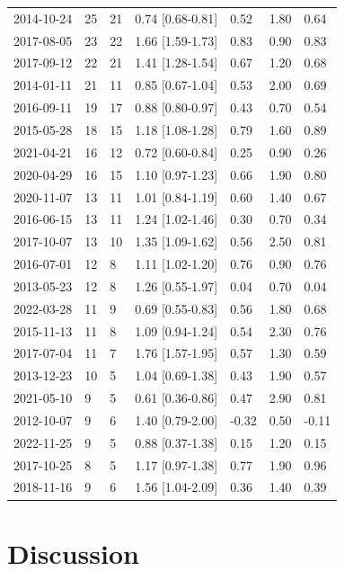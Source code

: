 \documentclass[preprint,12pt,authoryear]{elsarticle}
\begin{document}
\begin{table}[]
\begin{tabular}{lllll|ll}
2014-10-24 & 25 & 21 & 0.74 [0.68-0.81] & 0.52 & 1.80 & 0.64 \\
2017-08-05 & 23 & 22 & 1.66 [1.59-1.73] & 0.83 & 0.90 & 0.83 \\
2017-09-12 & 22 & 21 & 1.41 [1.28-1.54] & 0.67 & 1.20 & 0.68 \\
2014-01-11 & 21 & 11 & 0.85 [0.67-1.04] & 0.53 & 2.00 & 0.69 \\
2016-09-11 & 19 & 17 & 0.88 [0.80-0.97] & 0.43 & 0.70 & 0.54 \\
2015-05-28 & 18 & 15 & 1.18 [1.08-1.28] & 0.79 & 1.60 & 0.89 \\
2021-04-21 & 16 & 12 & 0.72 [0.60-0.84] & 0.25 & 0.90 & 0.26 \\
2020-04-29 & 16 & 15 & 1.10 [0.97-1.23] & 0.66 & 1.90 & 0.80 \\
2020-11-07 & 13 & 11 & 1.01 [0.84-1.19] & 0.60 & 1.40 & 0.67 \\
2016-06-15 & 13 & 11 & 1.24 [1.02-1.46] & 0.30 & 0.70 & 0.34 \\
2017-10-07 & 13 & 10 & 1.35 [1.09-1.62] & 0.56 & 2.50 & 0.81 \\
2016-07-01 & 12 & 8 & 1.11 [1.02-1.20] & 0.76 & 0.90 & 0.76 \\
2013-05-23 & 12 & 8 & 1.26 [0.55-1.97] & 0.04 & 0.70 & 0.04 \\
2022-03-28 & 11 & 9 & 0.69 [0.55-0.83] & 0.56 & 1.80 & 0.68 \\
2015-11-13 & 11 & 8 & 1.09 [0.94-1.24] & 0.54 & 2.30 & 0.76 \\
2017-07-04 & 11 & 7 & 1.76 [1.57-1.95] & 0.57 & 1.30 & 0.59 \\
2013-12-23 & 10 & 5 & 1.04 [0.69-1.38] & 0.43 & 1.90 & 0.57 \\
2021-05-10 & 9 & 5 & 0.61 [0.36-0.86] & 0.47 & 2.90 & 0.81 \\
2012-10-07 & 9 & 6 & 1.40 [0.79-2.00] & -0.32 & 0.50 & -0.11 \\
2022-11-25 & 9 & 5 & 0.88 [0.37-1.38] & 0.15 & 1.20 & 0.15 \\
2017-10-25 & 8 & 5 & 1.17 [0.97-1.38] & 0.77 & 1.90 & 0.96 \\
2018-11-16 & 9 & 6 & 1.56 [1.04-2.09] & 0.36 & 1.40 & 0.39 \\
\end{tabular}
    \label{tab:closures}
\end{table}


\section{Discussion}
\end{document}
